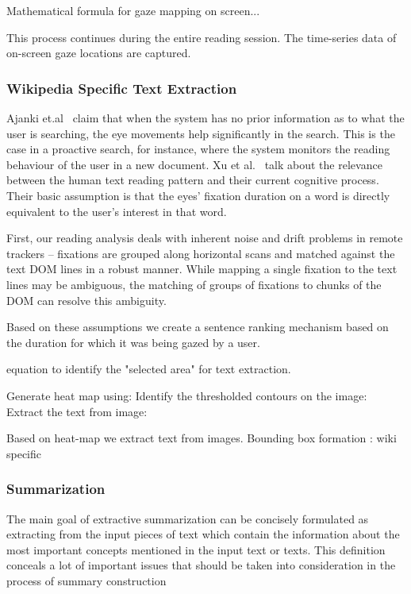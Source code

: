 \documentclass[12pt]{article}
\begin{document}
Mathematical formula for gaze mapping on screen...

This process continues during the entire reading session. The time-series data of on-screen gaze locations are captured. 



\subsubsection{Wikipedia Specific Text Extraction}

Ajanki et.al~\cite{bff9c00ddce3404ca729f4a96d53a701} claim that when the system has no prior information as to what the user is searching, the eye movements help significantly in the search. This is the case in a proactive search, for instance, where the system monitors the reading behaviour of the user in a new document. Xu et al.~\cite{xu2009user} talk about the relevance between the human text reading pattern and their current cognitive process. Their basic assumption is that the eyes' fixation duration on a word is directly equivalent to the user's interest in that word. 


First, our reading analysis deals
with inherent noise and drift problems in remote trackers –
fixations are grouped along horizontal scans and matched
against the text DOM lines in a robust manner. While
mapping a single fixation to the text lines may be
ambiguous, the matching of groups of fixations to chunks
of the DOM can resolve this ambiguity. 

Based on these assumptions we create a sentence ranking mechanism based on the duration for which it was being gazed by a user.

equation to identify the "selected area" for text extraction.

Generate heat map using:
Identify the thresholded contours on the image:
Extract the text from image:

Based on heat-map we extract text from images. Bounding box formation : wiki specific
        
        
\subsubsection{Summarization}


The main goal of extractive summarization can be
concisely formulated as extracting from the input
pieces of text which contain the information about
the most important concepts mentioned in the input
text or texts. This definition conceals a lot of important issues that should be taken into consideration
in the process of summary construction
\end{document}
